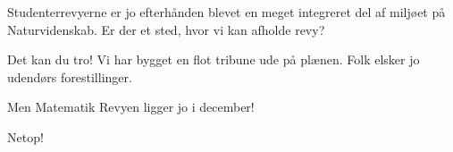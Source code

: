 \documentclass[a4paper,11pt]{article}
\begin{document}
\begin{sketch}
 Studenterrevyerne er jo efterhånden blevet en meget integreret del af miljøet på Naturvidenskab. Er der et sted, hvor vi kan afholde revy?

 Det kan du tro! Vi har bygget en flot tribune ude på plænen. Folk elsker jo udendørs forestillinger.

 Men Matematik Revyen ligger jo i december!

 Netop!

\end{sketch}
\end{document}
